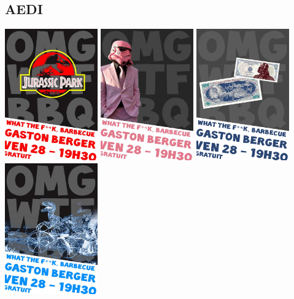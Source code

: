     \subsection{AEDI}
        \includegraphics[width=0.3\textwidth]{img/WTFBBQjp.jpg}
        \includegraphics[width=0.3\textwidth]{img/WTFBBQstorm.jpg}
        \includegraphics[width=0.3\textwidth]{img/WTFBBQsw.jpg}
        \includegraphics[width=0.3\textwidth]{img/WTFBBQvelo.jpg}
